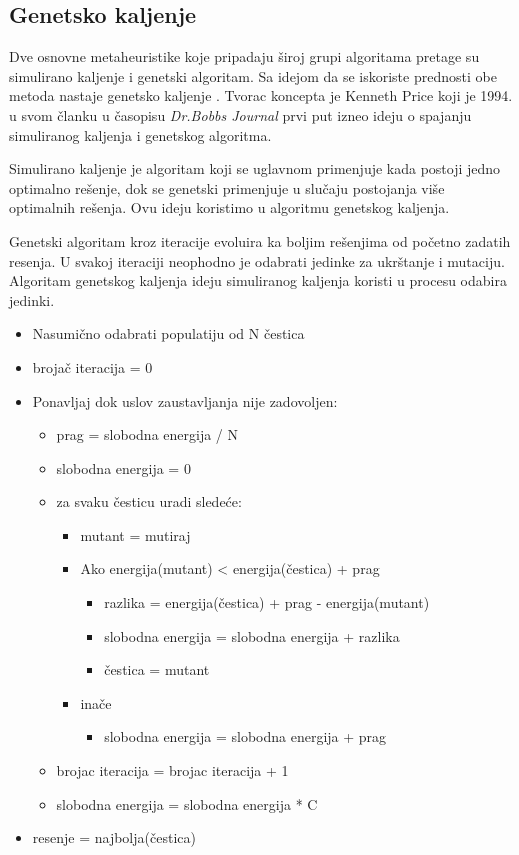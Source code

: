 \documentclass[a4paper]{article}
\begin{document}
\subsection{Genetsko kaljenje}

Dve osnovne metaheuristike koje pripadaju široj grupi algoritama pretage su simulirano kaljenje i genetski algoritam. Sa idejom da se iskoriste prednosti obe metoda nastaje genetsko kaljenje \cite{gk_master_rad}. Tvorac koncepta je Kenneth Price koji je 1994. u svom članku u časopisu \emph{Dr.Bobbs Journal} prvi put izneo ideju o spajanju simuliranog kaljenja i genetskog algoritma. \par
Simulirano kaljenje je algoritam koji se uglavnom primenjuje kada postoji jedno optimalno rešenje, dok se genetski primenjuje u slučaju postojanja više optimalnih rešenja. Ovu ideju koristimo u algoritmu genetskog kaljenja. \par
Genetski algoritam kroz iteracije evoluira ka boljim rešenjima od početno zadatih resenja. U svakoj iteraciji neophodno je odabrati jedinke za ukrštanje i mutaciju. Algoritam genetskog kaljenja ideju simuliranog kaljenja koristi u procesu odabira jedinki.
\newline
\begin{itemize}
\item[]Nasumično odabrati populatiju od N čestica
\item[] brojač iteracija = 0
\item[]  Ponavljaj dok uslov zaustavljanja nije zadovoljen:
\begin{itemize}
\item[] prag = slobodna energija / N
\item[] slobodna energija = 0
\item[] za svaku česticu uradi sledeće:
\begin{itemize}
\item[] mutant = mutiraj
\item[] Ako energija(mutant) < energija(čestica) + prag
\begin{itemize}
\item[]razlika = energija(čestica) + prag - energija(mutant)
\item[]slobodna energija = slobodna energija + razlika
\item[]čestica = mutant
\end{itemize}
\item[]inače 
\begin{itemize}
\item[] slobodna energija = slobodna energija + prag
\end{itemize}
\end{itemize}
\item[]brojac iteracija = brojac iteracija + 1
\item[]slobodna energija = slobodna energija * C
\end{itemize}
\item[]resenje = najbolja(čestica)
\end{itemize}
\end{document}
